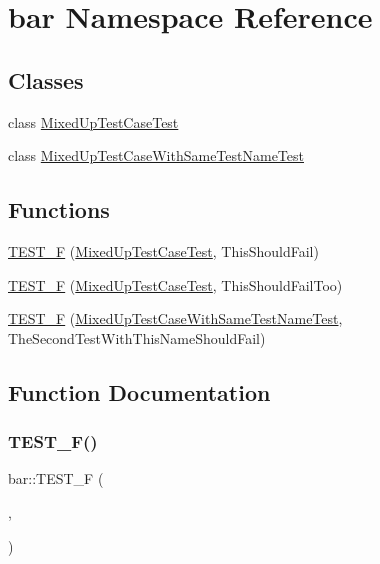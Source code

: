 \hypertarget{namespacebar}{}\section{bar Namespace Reference}
\label{namespacebar}
\subsection*{Classes}
\begin{DoxyCompactItemize}
\item 
class \mbox{\hyperlink{classbar_1_1MixedUpTestCaseTest}{Mixed\+Up\+Test\+Case\+Test}}
\item 
class \mbox{\hyperlink{classbar_1_1MixedUpTestCaseWithSameTestNameTest}{Mixed\+Up\+Test\+Case\+With\+Same\+Test\+Name\+Test}}
\end{DoxyCompactItemize}
\subsection*{Functions}
\begin{DoxyCompactItemize}
\item 
\mbox{\hyperlink{namespacebar_a0e342ef00f400f593f866279689c55ac}{T\+E\+S\+T\+\_\+F}} (\mbox{\hyperlink{classbar_1_1MixedUpTestCaseTest}{Mixed\+Up\+Test\+Case\+Test}}, This\+Should\+Fail)
\item 
\mbox{\hyperlink{namespacebar_adf88eb6e7ed65a5bd641aa80b237ea2c}{T\+E\+S\+T\+\_\+F}} (\mbox{\hyperlink{classbar_1_1MixedUpTestCaseTest}{Mixed\+Up\+Test\+Case\+Test}}, This\+Should\+Fail\+Too)
\item 
\mbox{\hyperlink{namespacebar_a600f9a0c34015b598089fb6b69adc63a}{T\+E\+S\+T\+\_\+F}} (\mbox{\hyperlink{classbar_1_1MixedUpTestCaseWithSameTestNameTest}{Mixed\+Up\+Test\+Case\+With\+Same\+Test\+Name\+Test}}, The\+Second\+Test\+With\+This\+Name\+Should\+Fail)
\end{DoxyCompactItemize}


\subsection{Function Documentation}
\mbox{\label{namespacebar_a0e342ef00f400f593f866279689c55ac}} 
\subsubsection{\texorpdfstring{TEST\_F()}{TEST\_F()}\hspace{0.1cm}{\footnotesize\ttfamily [1/3]}}
{\footnotesize\ttfamily bar\+::\+T\+E\+S\+T\+\_\+F (\begin{DoxyParamCaption}\item[{\mbox{\hyperlink{classbar_1_1MixedUpTestCaseTest}{Mixed\+Up\+Test\+Case\+Test}}}]{,  }\item[{This\+Should\+Fail}]{ }\end{DoxyParamCaption})}

